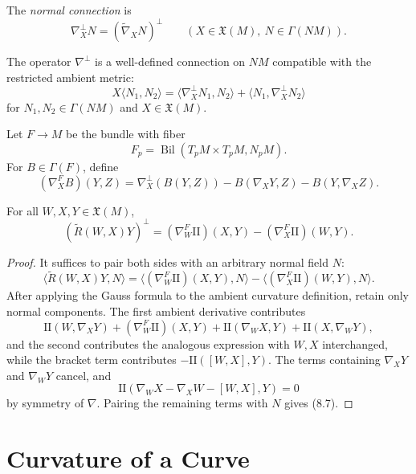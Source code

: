 The \emph{normal connection} is
\[
\nabla_X^\perp N=(\widetilde\nabla_XN)^\perp
\qquad
(X\in\mathfrak X(M),\ N\in\Gamma(NM)).
\]

\begin{proposition}
\label{prop:normal-connection-well-defined}

The operator $\nabla^\perp$ is a well-defined connection on $NM$ compatible
with the restricted ambient metric:
\[
X\langle N_1,N_2\rangle
=\langle\nabla_X^\perp N_1,N_2\rangle
 +\langle N_1,\nabla_X^\perp N_2\rangle
\]
for $N_1,N_2\in\Gamma(NM)$ and $X\in\mathfrak X(M)$.
\end{proposition}

Let $F\to M$ be the bundle with fiber
\[
F_p=\operatorname{Bil}(T_pM\times T_pM,N_pM).
\]
For $B\in\Gamma(F)$, define
\[
(\nabla_X^FB)(Y,Z)
=\nabla_X^\perp(B(Y,Z))
-B(\nabla_XY,Z)-B(Y,\nabla_XZ).
\]

\begin{theorem}
\label{thm:codazzi-equation}


For all $W,X,Y\in\mathfrak X(M)$,
\begin{equation}
(\widetilde R(W,X)Y)^\perp
=(\nabla_W^F\mathrm{II})(X,Y)-(\nabla_X^F\mathrm{II})(W,Y).
\tag{8.6}
\end{equation}
\end{theorem}

\begin{proof}
\sketch It suffices to pair both sides with an arbitrary normal field $N$:
\begin{equation}
\langle\widetilde R(W,X)Y,N\rangle
=\langle(\nabla_W^F\mathrm{II})(X,Y),N\rangle
-\langle(\nabla_X^F\mathrm{II})(W,Y),N\rangle.
\tag{8.7}
\end{equation}
After applying the Gauss formula to the ambient curvature definition, retain
only normal components. The first ambient derivative contributes
\[
\mathrm{II}(W,\nabla_XY)
+(\nabla_W^F\mathrm{II})(X,Y)
+\mathrm{II}(\nabla_WX,Y)
+\mathrm{II}(X,\nabla_WY),
\]
and the second contributes the analogous expression with $W,X$ interchanged,
while the bracket term contributes $-\mathrm{II}([W,X],Y)$. The terms
containing $\nabla_XY$ and $\nabla_WY$ cancel, and
\[
\mathrm{II}(\nabla_WX-\nabla_XW-[W,X],Y)=0
\]
by symmetry of $\nabla$. Pairing the remaining terms with $N$ gives (8.7).
\end{proof}

\section{Curvature of a Curve}

